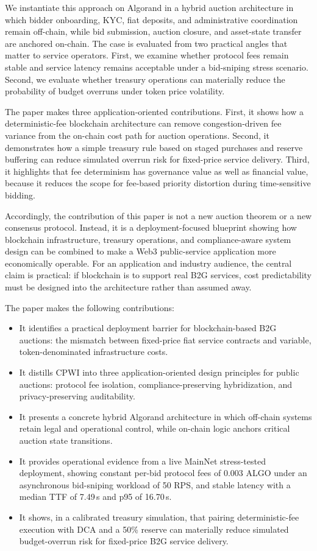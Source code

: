 \documentclass[runningheads]{llncs}
\begin{document}
We instantiate this approach on Algorand in a hybrid auction architecture in which bidder onboarding, KYC, fiat deposits, and administrative coordination remain off-chain, while bid submission, auction closure, and asset-state transfer are anchored on-chain. The case is evaluated from two practical angles that matter to service operators. First, we examine whether protocol fees remain stable and service latency remains acceptable under a bid-sniping stress scenario. Second, we evaluate whether treasury operations can materially reduce the probability of budget overruns under token price volatility.

The paper makes three application-oriented contributions. First, it shows how a deterministic-fee blockchain architecture can remove congestion-driven fee variance from the on-chain cost path for auction operations. Second, it demonstrates how a simple treasury rule based on staged purchases and reserve buffering can reduce simulated overrun risk for fixed-price service delivery. Third, it highlights that fee determinism has governance value as well as financial value, because it reduces the scope for fee-based priority distortion during time-sensitive bidding.

Accordingly, the contribution of this paper is not a new auction theorem or a new consensus protocol. Instead, it is a deployment-focused blueprint showing how blockchain infrastructure, treasury operations, and compliance-aware system design can be combined to make a Web3 public-service application more economically operable. For an application and industry audience, the central claim is practical: if blockchain is to support real B2G services, cost predictability must be designed into the architecture rather than assumed away.

The paper makes the following contributions:
\begin{itemize}
    \item It identifies a practical deployment barrier for blockchain-based B2G auctions: the mismatch between fixed-price fiat service contracts and variable, token-denominated infrastructure costs.
    \item It distills CPWI into three application-oriented design principles for public auctions: protocol fee isolation, compliance-preserving hybridization, and privacy-preserving auditability.
    \item It presents a concrete hybrid Algorand architecture in which off-chain systems retain legal and operational control, while on-chain logic anchors critical auction state transitions.
    \item It provides operational evidence from a live MainNet stress-tested deployment, showing constant per-bid protocol fees of 0.003 ALGO under an asynchronous bid-sniping workload of 50 RPS, and stable latency with a median TTF of 7.49\,s and p95 of 16.70\,s.
    \item It shows, in a calibrated treasury simulation, that pairing deterministic-fee execution with DCA and a 50\% reserve can materially reduce simulated budget-overrun risk for fixed-price B2G service delivery.
\end{itemize}
\end{document}
